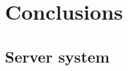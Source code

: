 \documentclass{scrartcl}
\begin{document}
\section{Conclusions}


\subsection{Server system}

 

\end{document}
